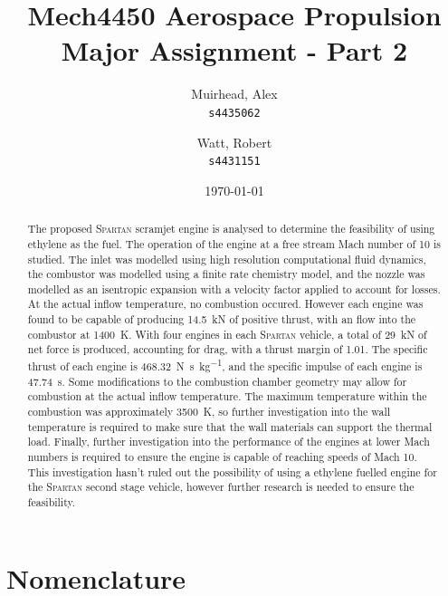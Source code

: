 \documentclass[a4paper]{article}
\title{
	\Large {\sc Mech}4450 Aerospace Propulsion \\
	\Huge Major Assignment - Part 2
}
\author{
	Muirhead, Alex \\ \texttt{s4435062}
	\and
	Watt, Robert \\ \texttt{s4431151}
}
\date{\today}
\begin{document}

\maketitle

\vfill

\begin{abstract}
    The proposed \textsc{Spartan} scramjet engine is analysed to determine the feasibility of using ethylene as the fuel. The operation of the engine at a free stream Mach number of 10 is studied. The inlet was modelled using high resolution computational fluid dynamics, the combustor was modelled using a finite rate chemistry model, and the nozzle was modelled as an isentropic expansion with a velocity factor applied to account for losses. At the actual inflow temperature, no combustion occured. However each engine was found to be capable of producing 14.5~kN of positive thrust, with an flow into the combustor at 1400~K. With four engines in each \textsc{Spartan} vehicle, a total of 29~kN of net force is produced, accounting for drag, with a thrust margin of 1.01. The specific thrust of each engine is \SI{468.32}{\N \s \per \kg}, and the specific impulse of each engine is \SI{47.74}{\s}. Some modifications to the combustion chamber geometry may allow for combustion at the actual inflow temperature. The maximum temperature within the combustion was approximately 3500~K, so further investigation into the wall temperature is required to make sure that the wall materials can support the thermal load. Finally, further investigation into the performance of the engines at lower Mach numbers is required to ensure the engine is capable of reaching speeds of Mach 10. This investigation hasn't ruled out the possibility of using a ethylene fuelled engine for the \textsc{Spartan} second stage vehicle, however further research is needed to ensure the feasibility. 
\end{abstract}


\vspace{10em}

\newpage

\tableofcontents
\listoffigures
\listoftables
{}
\newpage
\section*{Nomenclature}
\end{document}
